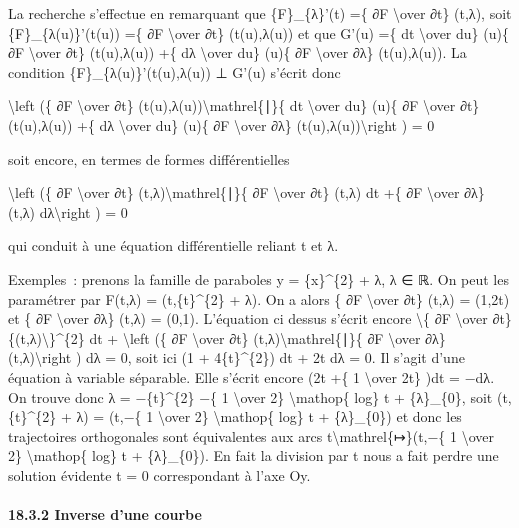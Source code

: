 \documentclass[]{article}
\begin{document}
La recherche s'effectue en remarquant que \{F\}\_\{λ\}'(t) =\{ ∂F
\textbackslash{}over ∂t\} (t,λ), soit \{F\}\_\{λ(u)\}'(t(u)) =\{ ∂F
\textbackslash{}over ∂t\} (t(u),λ(u)) et que G'(u) =\{ dt
\textbackslash{}over du\} (u)\{ ∂F \textbackslash{}over ∂t\} (t(u),λ(u))
+\{ dλ \textbackslash{}over du\} (u)\{ ∂F \textbackslash{}over ∂λ\}
(t(u),λ(u)). La condition \{F\}\_\{λ(u)\}'(t(u),λ(u)) ⊥ G'(u) s'écrit
donc

\textbackslash{}left (\{ ∂F \textbackslash{}over ∂t\}
(t(u),λ(u))\textbackslash{}mathrel\{∣\}\{ dt \textbackslash{}over du\}
(u)\{ ∂F \textbackslash{}over ∂t\} (t(u),λ(u)) +\{ dλ
\textbackslash{}over du\} (u)\{ ∂F \textbackslash{}over ∂λ\}
(t(u),λ(u))\textbackslash{}right ) = 0

soit encore, en termes de formes différentielles

\textbackslash{}left (\{ ∂F \textbackslash{}over ∂t\}
(t,λ)\textbackslash{}mathrel\{∣\}\{ ∂F \textbackslash{}over ∂t\} (t,λ)
dt +\{ ∂F \textbackslash{}over ∂λ\} (t,λ) dλ\textbackslash{}right ) = 0

qui conduit à une équation différentielle reliant t et λ.

Exemples~: prenons la famille de paraboles y = \{x\}\^{}\{2\} + λ, λ ∈
ℝ. On peut les paramétrer par F(t,λ) = (t,\{t\}\^{}\{2\} + λ). On a
alors \{ ∂F \textbackslash{}over ∂t\} (t,λ) = (1,2t) et \{ ∂F
\textbackslash{}over ∂λ\} (t,λ) = (0,1). L'équation ci dessus s'écrit
encore \textbackslash{}\textbar{}\{ ∂F \textbackslash{}over ∂t\}
\{(t,λ)\textbackslash{}\textbar{}\}\^{}\{2\} dt + \textbackslash{}left
(\{ ∂F \textbackslash{}over ∂t\} (t,λ)\textbackslash{}mathrel\{∣\}\{ ∂F
\textbackslash{}over ∂λ\} (t,λ)\textbackslash{}right ) dλ = 0, soit ici
(1 + 4\{t\}\^{}\{2\}) dt + 2t dλ = 0. Il s'agit d'une équation à
variable séparable. Elle s'écrit encore (2t +\{ 1 \textbackslash{}over
2t\} )dt = −dλ. On trouve donc λ = −\{t\}\^{}\{2\} −\{ 1
\textbackslash{}over 2\} \textbackslash{}mathop\{ log\}
\textbar{}t\textbar{} + \{λ\}\_\{0\}, soit (t,\{t\}\^{}\{2\} + λ) =
(t,−\{ 1 \textbackslash{}over 2\} \textbackslash{}mathop\{ log\}
\textbar{}t\textbar{} + \{λ\}\_\{0\}) et donc les trajectoires
orthogonales sont équivalentes aux arcs
t\textbackslash{}mathrel\{↦\}(t,−\{ 1 \textbackslash{}over 2\}
\textbackslash{}mathop\{ log\} t + \{λ\}\_\{0\}). En fait la division
par t nous a fait perdre une solution évidente t = 0 correspondant à
l'axe Oy.

\paragraph{18.3.2 Inverse d'une courbe}
\end{document}
